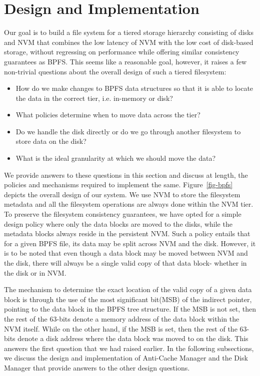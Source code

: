 \section{Design and Implementation}
\label{sec-design}
Our goal is to build a file system for a tiered storage hierarchy consisting of disks and NVM that combines the low latency of NVM with the low cost of disk-based storage, without regressing on performance while offering similar consistency guarantees as BPFS. This seems like a reasonable goal, however, it raises a few non-trivial questions about the overall design of such a tiered filesystem:

\begin{itemize}
\item How do we make changes to BPFS data structures so that it is able to locate the data in the correct tier, i.e. in-memory or disk? \vspace{-0.1in}
\item What policies determine when to move data across the tier? \vspace{-0.1in}
\item Do we handle the disk directly or do we go through another filesystem to store data on the disk? \vspace{-0.1in}
\item What is the ideal granularity at which we should move the data? \vspace{-0.1in}
\end{itemize}

We provide answers to these questions in this section and discuss at length, the policies and mechanisms required to implement the same. Figure~\ref{fig-bpfs} depicts the overall design of our system. We use NVM to store the filesystem metadata and all the filesystem operations are always done within the NVM tier. To preserve the filesystem consistency guarantees, we have opted for a simple design policy where only the data blocks are moved to the disks, while the metadata blocks always reside in the persistent NVM. Such a policy entails that for a given BPFS file, its data may be split across NVM and the disk. However, it is to be noted that even though a data block may be moved between NVM and the disk, there will always be a single valid copy of that data block- whether in the disk or in NVM.

The mechanism to determine the exact location of the valid copy of a given data block is through the use of the most significant bit(MSB) of the indirect pointer, pointing to the data block in the BPFS tree structure. If the MSB is not set, then the rest of the 63-bits denote a memory address of the data block within the NVM itself. While on the other hand, if the MSB is set, then the rest of the 63-bits denote a disk address where the data block was moved to on the disk. This answers the first question that we had raised earlier. In the following subsections, we discuss the design and implementation of Anti-Cache Manager and the Disk Manager that provide answers to the other design questions.

